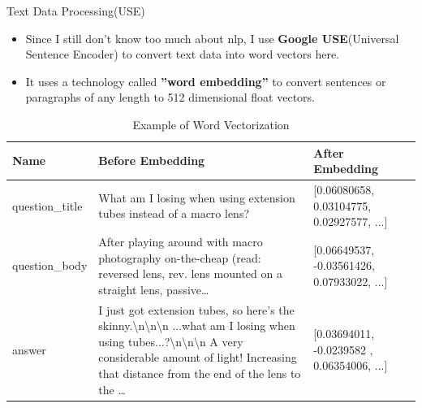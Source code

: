 \documentclass[
 size=12pt,
 paper=smartboard, %
 mode=present, %
 display=slides, %
style=tuliplab,
pauseslide,
fleqn,leqno]{powerdot}
\begin{document}
\begin{slide}{Text Data Processing(USE)}
    \begin{itemize}
        \item Since I still don't know too much about nlp, I use \textbf{Google USE}(Universal Sentence Encoder) to convert text data into word vectors here.
        \item It uses a technology called \textbf{''word embedding''} to convert sentences or paragraphs of any length to 512 dimensional float vectors.
    \end{itemize}
    \begin{table}
        \centering
        \caption{Example of Word Vectorization}
        \label{tbl:tx_vec}
        \begin{tabular}{lm{7cm}lm{7cm}}
            \hline
            Name & Before Embedding & After Embedding\\
            \hline
            question_title & What am I losing when using extension tubes instead of a macro lens?&[0.06080658,  0.03104775,  0.02927577, ...]\\
            \hline
            question_body & After playing around with macro photography on-the-cheap (read: reversed lens, rev. lens mounted on a straight lens, passive\dots&[0.06649537, -0.03561426,  0.07933022, ...]\\
            \hline
            answer & I just got extension tubes, so here's the skinny.\textbackslash n\textbackslash n\textbackslash n  ...what am I losing when using tubes...?\textbackslash n\textbackslash n\textbackslash n A very considerable amount of light!  Increasing that distance from the end of the lens to the \dots&[0.03694011, -0.0239582 ,  0.06354006, ...]\\
            \hline
        \end{tabular}
    \end{table}
\end{slide}
\end{document}

